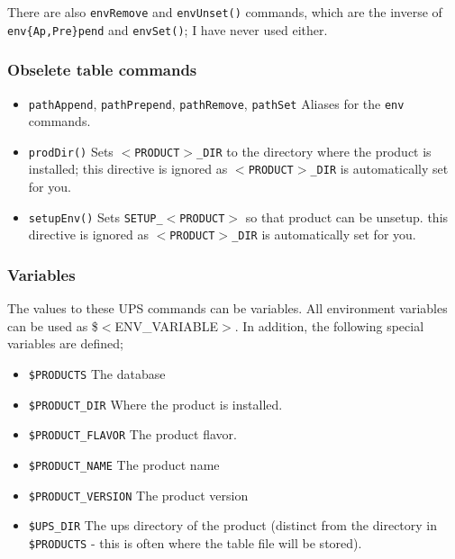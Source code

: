 \documentclass{article}
\newcommand{\code}[1]{\texttt{#1}}
\begin{document}
There are also \code{envRemove} and \code{envUnset()} commands, which
are the inverse of \code{env\{Ap,Pre\}pend} and \code{envSet()}; I have
never used either.     

\subsubsection{Obselete table commands}

\begin{itemize}
   \item \code{pathAppend}, \code{pathPrepend}, \code{pathRemove}, \code{pathSet}
     Aliases for the \code{env} commands.
     
   \item \code{prodDir()}
     Sets \code{$<$PRODUCT$>$\_DIR} to the directory where the product is installed;
     this directive is ignored as \code{$<$PRODUCT$>$\_DIR} is automatically set for you.
     
   \item \code{setupEnv()}
     Sets \code{SETUP\_$<$PRODUCT$>$} so that product can be unsetup.
     this directive is ignored as \code{$<$PRODUCT$>$\_DIR} is automatically set for you.
\end{itemize}
        
\subsubsection{Variables}

The values to these UPS commands can be variables. All environment
variables can be used as \${$<$ENV\_VARIABLE$>$}. In addition, the following special
variables are defined;

\begin{itemize}
  \item \code{\${PRODUCTS}}
    The database
    
  \item \code{\${PRODUCT\_DIR}}
    Where the product is installed.
    
  \item \code{\${PRODUCT\_FLAVOR}}
    The product flavor.
    
  \item \code{\${PRODUCT\_NAME}}
    The product name
    
  \item \code{\${PRODUCT\_VERSION}}
    The product version
    
  \item \code{\${UPS\_DIR}}
    The ups directory of the product (distinct from the directory
    in \code{\$PRODUCTS} - this is often where the table file will be stored).
\end{itemize}
\end{document}
